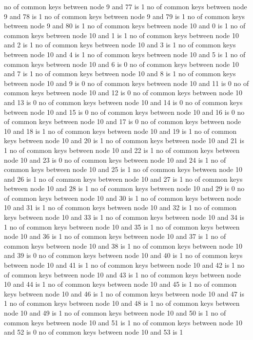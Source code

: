 no of common keys between node 9 and 77 is 1
no of common keys between node 9 and 78 is 1
no of common keys between node 9 and 79 is 1
no of common keys between node 9 and 80 is 1
no of common keys between node 10 and 0 is 1
no of common keys between node 10 and 1 is 1
no of common keys between node 10 and 2 is 1
no of common keys between node 10 and 3 is 1
no of common keys between node 10 and 4 is 1
no of common keys between node 10 and 5 is 1
no of common keys between node 10 and 6 is 0
no of common keys between node 10 and 7 is 1
no of common keys between node 10 and 8 is 1
no of common keys between node 10 and 9 is 0
no of common keys between node 10 and 11 is 0
no of common keys between node 10 and 12 is 0
no of common keys between node 10 and 13 is 0
no of common keys between node 10 and 14 is 0
no of common keys between node 10 and 15 is 0
no of common keys between node 10 and 16 is 0
no of common keys between node 10 and 17 is 0
no of common keys between node 10 and 18 is 1
no of common keys between node 10 and 19 is 1
no of common keys between node 10 and 20 is 1
no of common keys between node 10 and 21 is 1
no of common keys between node 10 and 22 is 1
no of common keys between node 10 and 23 is 0
no of common keys between node 10 and 24 is 1
no of common keys between node 10 and 25 is 1
no of common keys between node 10 and 26 is 1
no of common keys between node 10 and 27 is 1
no of common keys between node 10 and 28 is 1
no of common keys between node 10 and 29 is 0
no of common keys between node 10 and 30 is 1
no of common keys between node 10 and 31 is 1
no of common keys between node 10 and 32 is 1
no of common keys between node 10 and 33 is 1
no of common keys between node 10 and 34 is 1
no of common keys between node 10 and 35 is 1
no of common keys between node 10 and 36 is 1
no of common keys between node 10 and 37 is 1
no of common keys between node 10 and 38 is 1
no of common keys between node 10 and 39 is 0
no of common keys between node 10 and 40 is 1
no of common keys between node 10 and 41 is 1
no of common keys between node 10 and 42 is 1
no of common keys between node 10 and 43 is 1
no of common keys between node 10 and 44 is 1
no of common keys between node 10 and 45 is 1
no of common keys between node 10 and 46 is 1
no of common keys between node 10 and 47 is 1
no of common keys between node 10 and 48 is 1
no of common keys between node 10 and 49 is 1
no of common keys between node 10 and 50 is 1
no of common keys between node 10 and 51 is 1
no of common keys between node 10 and 52 is 0
no of common keys between node 10 and 53 is 1
